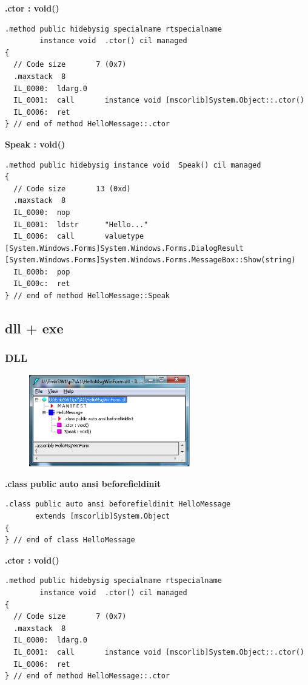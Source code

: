 \textbf{.ctor : void()}
\begin{lstlisting}[style=Csharp]
.method public hidebysig specialname rtspecialname 
        instance void  .ctor() cil managed
{
  // Code size       7 (0x7)
  .maxstack  8
  IL_0000:  ldarg.0
  IL_0001:  call       instance void [mscorlib]System.Object::.ctor()
  IL_0006:  ret
} // end of method HelloMessage::.ctor
\end{lstlisting}

\textbf{Speak : void()}
\begin{lstlisting}[style=Csharp]
.method public hidebysig instance void  Speak() cil managed
{
  // Code size       13 (0xd)
  .maxstack  8
  IL_0000:  nop
  IL_0001:  ldstr      "Hello..."
  IL_0006:  call       valuetype [System.Windows.Forms]System.Windows.Forms.DialogResult [System.Windows.Forms]System.Windows.Forms.MessageBox::Show(string)
  IL_000b:  pop
  IL_000c:  ret
} // end of method HelloMessage::Speak
\end{lstlisting}


\subsection{dll + exe}
\subsubsection{DLL}
\begin{figure}[htbp]
	\centering
	\includegraphics[width=7cm]{images/ILDASM_dll_dll.png}
\end{figure}

\textbf{.class public auto ansi beforefieldinit}
\begin{lstlisting}[style=Csharp]
.class public auto ansi beforefieldinit HelloMessage
       extends [mscorlib]System.Object
{
} // end of class HelloMessage
\end{lstlisting}

\textbf{.ctor : void()}
\begin{lstlisting}[style=Csharp]
.method public hidebysig specialname rtspecialname 
        instance void  .ctor() cil managed
{
  // Code size       7 (0x7)
  .maxstack  8
  IL_0000:  ldarg.0
  IL_0001:  call       instance void [mscorlib]System.Object::.ctor()
  IL_0006:  ret
} // end of method HelloMessage::.ctor
\end{lstlisting}

